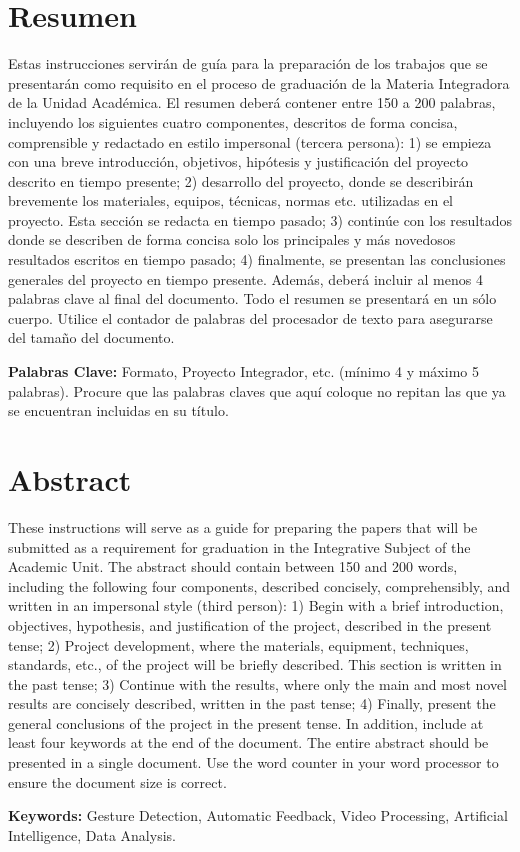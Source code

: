 \chapter{Resumen}

Estas instrucciones servirán de guía para la preparación de los trabajos que se presentarán como requisito en el proceso de graduación de la Materia Integradora de la Unidad Académica. El resumen deberá contener entre 150 a 200 palabras, incluyendo los siguientes cuatro componentes, descritos de forma concisa, comprensible y redactado en estilo impersonal (tercera persona): 1) se empieza con una breve introducción, objetivos, hipótesis y justificación del proyecto descrito en tiempo presente; 2) desarrollo del proyecto, donde se describirán brevemente los materiales, equipos, técnicas, normas etc. utilizadas en el proyecto. Esta sección se redacta en tiempo pasado; 3) continúe con los resultados donde se describen de forma concisa solo los principales y más novedosos resultados escritos en tiempo pasado; 4) finalmente, se presentan las conclusiones generales del proyecto en tiempo presente. Además, deberá incluir al menos 4 palabras clave al final del documento. Todo el resumen se presentará en un sólo cuerpo. Utilice el contador de palabras del procesador de texto para asegurarse del tamaño del documento. 

\textbf{Palabras Clave:} Formato, Proyecto Integrador, etc. (mínimo 4 y máximo 5 palabras).
Procure que las palabras claves que aquí coloque no repitan las que ya se encuentran incluidas en su título.


\chapter{Abstract}
These instructions will serve as a guide for preparing the papers that will be submitted as a requirement for graduation in the Integrative Subject of the Academic Unit. The abstract should contain between 150 and 200 words, including the following four components, described concisely, comprehensibly, and written in an impersonal style (third person): 1) Begin with a brief introduction, objectives, hypothesis, and justification of the project, described in the present tense; 2) Project development, where the materials, equipment, techniques, standards, etc., of the project will be briefly described. This section is written in the past tense; 3) Continue with the results, where only the main and most novel results are concisely described, written in the past tense; 4) Finally, present the general conclusions of the project in the present tense. In addition, include at least four keywords at the end of the document. The entire abstract should be presented in a single document. Use the word counter in your word processor to ensure the document size is correct.

\textbf{Keywords:} Gesture Detection, Automatic Feedback, Video Processing, Artificial Intelligence, Data Analysis.

\newpage